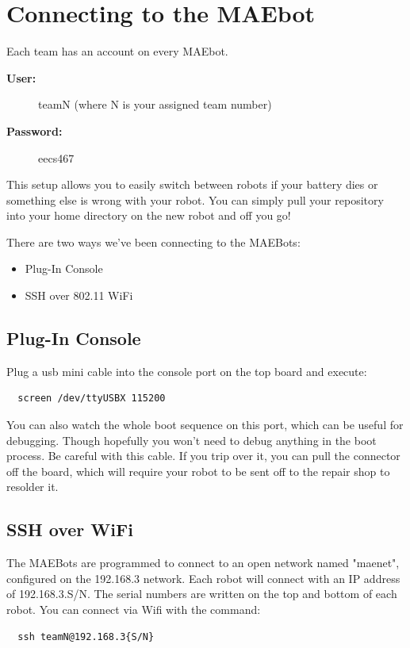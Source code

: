 \documentclass{article}
\begin{document}
\section*{Connecting to the MAEbot}

Each team has an account on every MAEbot.

\begin{description}
  \item[\textbf{User:}]     teamN   (where N is your assigned team number)
  \item[\textbf{Password:}] eecs467
\end{description}
  

This setup allows you to easily switch between robots if your battery dies or something else is wrong with your robot. You can simply pull your repository into your home directory 
on the new robot and off you go!

There are two ways we've been connecting to the MAEBots:

\begin{itemize}
 \item Plug-In Console
 \item SSH over 802.11 WiFi
\end{itemize}

\subsection*{Plug-In Console}
Plug a usb mini cable into the console port on the top board and execute:

\begin{verbatim}
  screen /dev/ttyUSBX 115200
\end{verbatim}

You can also watch the whole boot sequence on this port, which can be useful for debugging. Though hopefully you won't need to debug anything in the boot process.
Be careful with this cable. If you trip over it, you can pull the connector off the board, which will require your robot to be sent off to the repair shop to resolder it.

\subsection*{SSH over WiFi}
The MAEBots are programmed to connect to an open network named "maenet", configured on the 192.168.3 network. Each robot will connect with an IP address of 192.168.3.{S/N}. The 
serial numbers are written on the top and bottom of each robot. You can connect via Wifi with the command:

\begin{verbatim}
  ssh teamN@192.168.3{S/N}
\end{verbatim}
\end{document}
